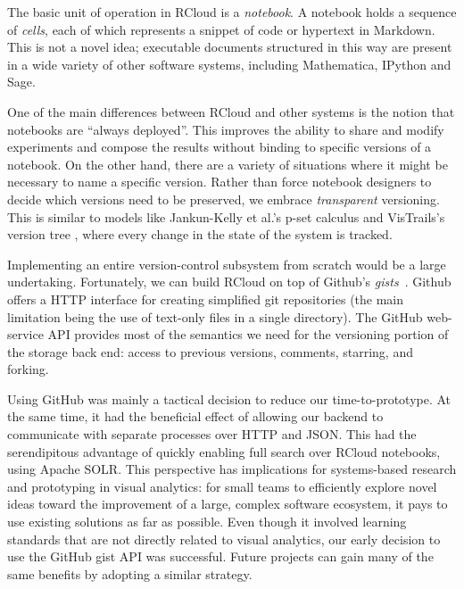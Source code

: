 The basic unit of operation in RCloud is a \emph{notebook}. A notebook
holds a sequence of \emph{cells}, each of which represents a
snippet of code or hypertext in Markdown. This is not a novel idea;
executable documents structured in this way are present in a wide
variety of other software systems, including Mathematica, IPython and Sage.

One of the main differences between RCloud and other systems is the
notion that notebooks are ``always deployed''. This improves the
ability to share and modify experiments and compose the results
without binding to specific versions of a notebook.
On the other hand, there are a variety of situations where it might
be necessary to name a specific version. Rather than force notebook
designers to decide which versions need to be preserved,
we embrace \emph{transparent} versioning.
This is similar to models like Jankun-Kelly et al.'s p-set calculus \cite{Jankun-Kelly:2007:MFV}
and VisTrails's version tree \cite{Callahan:2006:VVM}, where every change in the state of the system is tracked.

Implementing an entire version-control subsystem from scratch would
be a large undertaking. Fortunately, we can build RCloud on top of Github's
\emph{gists}~\cite{Github:2014:GG}. Github offers a HTTP interface
for creating simplified git repositories (the main limitation being the
use of text-only files in a single directory). The GitHub web-service
API provides most of the semantics we need for the versioning
portion of the storage back end: access to previous versions,
comments, starring, and forking.

Using GitHub was mainly a tactical decision to reduce our
time-to-prototype. At the same time, it had the beneficial effect of
allowing our backend to communicate with separate processes over HTTP
and JSON. This had the serendipitous advantage of quickly enabling
full search over RCloud notebooks, using Apache SOLR.
%
This perspective has implications for
systems-based research and prototyping in visual analytics:
for small teams to efficiently explore novel ideas toward the
improvement of a large, complex software ecosystem, it pays
to use existing solutions as far as possible.
%
Even though it involved learning standards that are not directly
related to visual analytics, our early decision to use the GitHub
gist API was successful. Future projects can gain many
of the same benefits by adopting a similar strategy.


